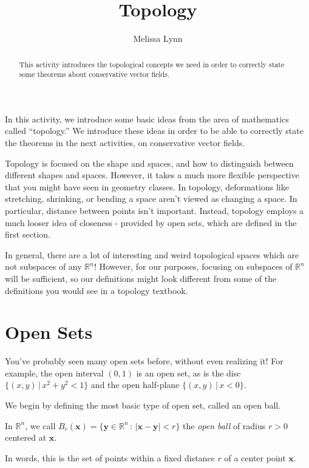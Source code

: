 \documentclass{ximera}
\title{Topology}
\author{Melissa Lynn}
\begin{document}
  
\begin{abstract}  
This activity introduces the topological concepts we need in order to correctly state some theorems about conservative vector fields. 
\end{abstract}  
\maketitle

In this activity, we introduce some basic ideas from the area of mathematics called ``topology.'' We introduce these ideas in order to be able to correctly state the theorems in the next activities, on conservative vector fields.

Topology is focused on the shape and spaces, and how to distinguish between different shapes and spaces. However, it takes a much more flexible perspective that you might have seen in geometry classes. In topology, deformations like stretching, shrinking, or bending a space aren't viewed as changing a space. In particular, distance between points isn't important. Instead, topology employs a much looser idea of closeness - provided by open sets, which are defined in the first section.

In general, there are a lot of interesting and weird topological spaces which are not subspaces of any $\mathbb{R}^n$! However, for our purposes, focusing on subspaces of $\mathbb{R}^n$ will be sufficient, so our definitions might look different from some of the definitions you would see in a topology textbook. 

\section{Open Sets}

You've probably seen many open sets before, without even realizing it! For example, the open interval $(0,1)$ is an open set, as is the disc $\{(x,y)\,|\,x^2+y^2<1\}$ and the open half-plane $\{(x,y)\,|\,x<0\}$.


We begin by defining the most basic type of open set, called an open ball.

\begin{definition}
In $\mathbb{R}^n$, we call $B_r(\mathbf{x})=\{\mathbf{y}\in\mathbb{R}^n\,:\,|\mathbf{x}-\mathbf{y}|<r\}$ the \emph{open ball} of radius $r>0$ centered at $\mathbf{x}$.
\end{definition}

In words, this is the set of points within a fixed distance $r$ of a center point $\mathbf{x}$.
\end{document}

